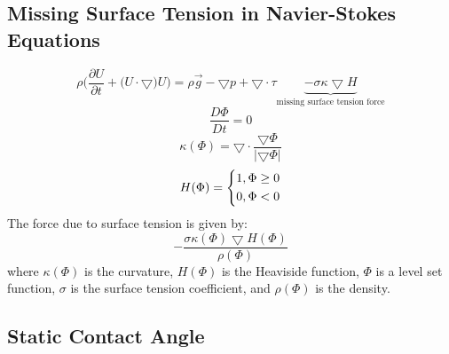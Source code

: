 \documentclass{article}
\numberwithin{equation}{subsection}
\begin{document}
\subsection{Missing Surface Tension in Navier-Stokes Equations}
\begin{equation}
    \rho \Bigg(\frac{\partial U}{\partial t} + \Big(U \cdot \bigtriangledown) U\Bigg) = \rho \vec{g} - \bigtriangledown p + \bigtriangledown  \cdot \tau \underbrace{- \sigma\kappa\bigtriangledown H}_\text{missing surface tension force}
\end{equation}
\begin{equation}
    \frac{D \Phi}{Dt} = 0
\end{equation}
\begin{equation}
    \kappa(\Phi) = \bigtriangledown \cdot \frac{\bigtriangledown \Phi}{|\bigtriangledown \Phi|}
\end{equation}
\begin{equation}
    H(\Phi) =
    \begin{dcases*}
        1, \Phi \ge 0 \\
        0, \Phi < 0
        \end{dcases*}
\end{equation}
The force due to surface tension is given by:
\begin{equation}
    - \frac{\sigma \kappa(\Phi)\bigtriangledown H(\Phi)}{\rho(\Phi)}
\end{equation}
where $\kappa (\Phi)$ is the curvature, $H(\Phi)$ is the Heaviside function, $\Phi$ is a level set function, $\sigma$ is the surface tension coefficient, and $\rho(\Phi)$ is the density.



\subsection{Static Contact Angle}

\goodbreak
\newpage



\end{document}
